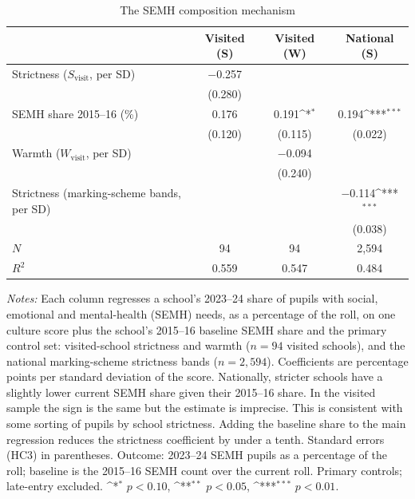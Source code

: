 \begin{table}[htbp]\centering
\caption{The SEMH composition mechanism}
\label{tab:semh_mechanism}
\def\sym#1{\ifmmode^{#1}\else\(^{#1}\)\fi}

\begin{tabular}{l*{3}{c}}
\toprule
                    &\multicolumn{1}{c}{Visited (S)}&\multicolumn{1}{c}{Visited (W)}&\multicolumn{1}{c}{National (S)}\\
\midrule
Strictness ($S_{\text{visit}}$, per SD)&      $-$0.257         &                     &                     \\
                    &     (0.280)         &                     &                     \\
\addlinespace
SEMH share 2015--16 (\%)&       0.176 &       0.191\sym{*}&       0.194\sym{***}\\
                    &     (0.120)         &     (0.115)         &     (0.022)         \\
\addlinespace
Warmth ($W_{\text{visit}}$, per SD)&                     &      $-$0.094         &                     \\
                    &                     &     (0.240)         &                     \\
\addlinespace
Strictness (marking-scheme bands, per SD)&                     &                     &      $-$0.114\sym{***}\\
                    &                     &                     &     (0.038)         \\
\midrule
$N$                 &          94         &          94       &        2{,}594         \\
$R^2$                  &       0.559         &       0.547         &       0.484         \\
\bottomrule
\end{tabular}
\begin{minipage}{\linewidth}
\smallskip
\footnotesize\textit{Notes:} Each column regresses a school's 2023--24 share of pupils with social, emotional and mental-health (SEMH) needs, as a percentage of the roll, on one culture score plus the school's 2015--16 baseline SEMH share and the primary control set: visited-school strictness and warmth ($n=94$ visited schools), and the national marking-scheme strictness bands ($n=2{,}594$). Coefficients are percentage points per standard deviation of the score. Nationally, stricter schools have a slightly lower current SEMH share given their 2015--16 share. In the visited sample the sign is the same but the estimate is imprecise. This is consistent with some sorting of pupils by school strictness. Adding the baseline share to the main regression reduces the strictness coefficient by under a tenth.
Standard errors (HC3) in parentheses. Outcome: 2023--24 SEMH pupils as a percentage of the roll; baseline is the 2015--16 SEMH count over the current roll. Primary controls; late-entry excluded. \sym{*} \(p<0.10\), \sym{**} \(p<0.05\), \sym{***} \(p<0.01\).
\end{minipage}
\end{table}

